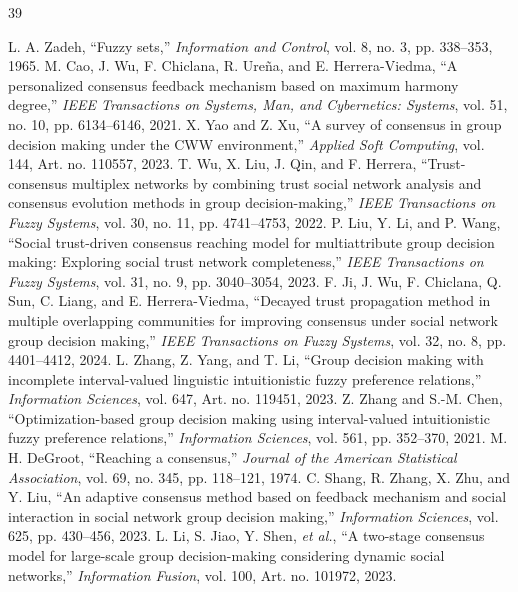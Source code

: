 \documentclass[journal]{IEEEtran}
\begin{document}
\FloatBarrier
\begin{thebibliography}{39}
\setlength{\itemsep}{-0.45ex}

 L. A. Zadeh, ``Fuzzy sets,'' \emph{Information and Control}, vol. 8, no. 3, pp. 338--353, 1965.
 M. Cao, J. Wu, F. Chiclana, R. Ure\~na, and E. Herrera-Viedma, ``A personalized consensus feedback mechanism based on maximum harmony degree,'' \emph{IEEE Transactions on Systems, Man, and Cybernetics: Systems}, vol. 51, no. 10, pp. 6134--6146, 2021.
 X. Yao and Z. Xu, ``A survey of consensus in group decision making under the CWW environment,'' \emph{Applied Soft Computing}, vol. 144, Art. no. 110557, 2023.
 T. Wu, X. Liu, J. Qin, and F. Herrera, ``Trust-consensus multiplex networks by combining trust social network analysis and consensus evolution methods in group decision-making,'' \emph{IEEE Transactions on Fuzzy Systems}, vol. 30, no. 11, pp. 4741--4753, 2022.
 P. Liu, Y. Li, and P. Wang, ``Social trust-driven consensus reaching model for multiattribute group decision making: Exploring social trust network completeness,'' \emph{IEEE Transactions on Fuzzy Systems}, vol. 31, no. 9, pp. 3040--3054, 2023.
 F. Ji, J. Wu, F. Chiclana, Q. Sun, C. Liang, and E. Herrera-Viedma, ``Decayed trust propagation method in multiple overlapping communities for improving consensus under social network group decision making,'' \emph{IEEE Transactions on Fuzzy Systems}, vol. 32, no. 8, pp. 4401--4412, 2024.
 L. Zhang, Z. Yang, and T. Li, ``Group decision making with incomplete interval-valued linguistic intuitionistic fuzzy preference relations,'' \emph{Information Sciences}, vol. 647, Art. no. 119451, 2023.
 Z. Zhang and S.-M. Chen, ``Optimization-based group decision making using interval-valued intuitionistic fuzzy preference relations,'' \emph{Information Sciences}, vol. 561, pp. 352--370, 2021.
 M. H. DeGroot, ``Reaching a consensus,'' \emph{Journal of the American Statistical Association}, vol. 69, no. 345, pp. 118--121, 1974.
 C. Shang, R. Zhang, X. Zhu, and Y. Liu, ``An adaptive consensus method based on feedback mechanism and social interaction in social network group decision making,'' \emph{Information Sciences}, vol. 625, pp. 430--456, 2023.
 L. Li, S. Jiao, Y. Shen, \emph{et al.}, ``A two-stage consensus model for large-scale group decision-making considering dynamic social networks,'' \emph{Information Fusion}, vol. 100, Art. no. 101972, 2023.

\end{thebibliography}
\end{document}
